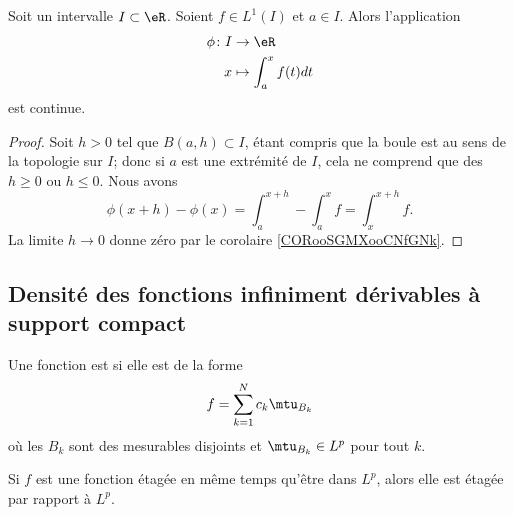 \begin{proposition}	\label{PROPooANISooKzQrnH}
	Soit un intervalle \( I\subset \eR\). Soient \( f\in L^1(I)\) et \( a\in I\). Alors l'application
	\begin{equation}
		\begin{aligned}
			\phi\colon I & \to \eR                \\
			x            & \mapsto \int_a^xf(t)dt
		\end{aligned}
	\end{equation}
	est continue.
\end{proposition}

\begin{proof}
	Soit \( h>0\) tel que \( B(a,h)\subset I\), étant compris que la boule est au sens de la topologie sur \( I\); donc si \( a\) est une extrémité de \( I\), cela ne comprend que des \( h\geq 0\) ou \( h\leq 0\). Nous avons
	\begin{equation}
		\phi(x+h)-\phi(x)=\int_a^{x+h}-\int_a^xf=\int_x^{x+h}f.
	\end{equation}
	La limite \( h\to0\) donne zéro par le corolaire \ref{CORooSGMXooCNfGNk}.
\end{proof}

\subsection{Densité des fonctions infiniment dérivables à support compact}

\begin{definition}
	Une fonction est  si elle est de la forme
	\begin{equation}
		f=\sum_{k=1}^Nc_k\mtu_{B_k}
	\end{equation}
	où les \( B_k\) sont des mesurables disjoints et \( \mtu_{B_k}\in L^p\) pour tout \( k\).
\end{definition}

\begin{lemma}   \label{LemWHIRdaX}
	Si \( f\) est une fonction étagée en même temps qu'être dans \( L^p\), alors elle est étagée par rapport à \( L^p\).
\end{lemma}

